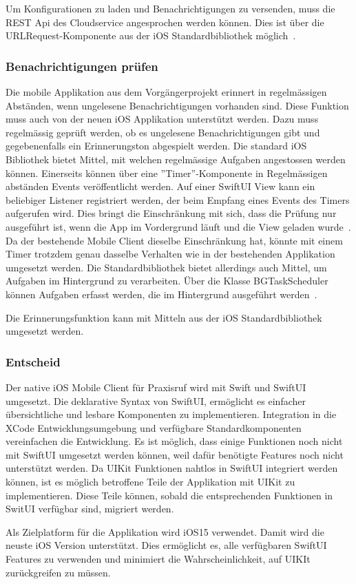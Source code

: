 Um Konfigurationen zu laden und Benachrichtigungen zu versenden, muss die REST Api des Cloudservice angesprochen werden können.
Dies ist über die URLRequest-Komponente aus der iOS Standardbibliothek möglich~\cite{ios_urlrequest}.

\subsubsection{Benachrichtigungen prüfen}

Die mobile Applikation aus dem Vorgängerprojekt erinnert in regelmässigen Abständen, wenn ungelesene Benachrichtigungen vorhanden sind.
Diese Funktion muss auch von der neuen iOS Applikation unterstützt werden.
Dazu muss regelmässig geprüft werden, ob es ungelesene Benachrichtigungen gibt und gegebenenfalls ein Erinnerungston abgespielt werden.
Die standard iOS Bibliothek bietet Mittel, mit welchen regelmässige Aufgaben angestossen werden können.
Einerseits können über eine ''Timer''-Komponente in Regelmässigen abständen Events veröffentlicht werden.
Auf einer SwiftUI View kann ein beliebiger Listener registriert werden, der beim Empfang eines Events des Timers aufgerufen wird.
Dies bringt die Einschränkung mit sich, dass die Prüfung nur ausgeführt ist, wenn die App im Vordergrund läuft und die View geladen wurde~\cite{ios_timer}.
Da der bestehende Mobile Client dieselbe Einschränkung hat, könnte mit einem Timer trotzdem genau dasselbe Verhalten wie in der bestehenden Applikation umgesetzt werden.
Die Standardbibliothek bietet allerdings auch Mittel, um Aufgaben im Hintergrund zu verarbeiten.
Über die Klasse BGTaskScheduler können Aufgaben erfasst werden, die im Hintergrund ausgeführt werden~\cite{ios_bgtaskscheduler}.

Die Erinnerungsfunktion kann mit Mitteln aus der iOS Standardbibliothek umgesetzt werden.

\subsubsection{Entscheid}

Der native iOS Mobile Client für Praxisruf wird mit Swift und SwiftUI umgesetzt.
Die deklarative Syntax von SwiftUI, ermöglicht es einfacher übersichtliche und lesbare Komponenten zu implementieren.
Integration in die XCode Entwicklungsumgebung und verfügbare Standardkomponenten vereinfachen die Entwicklung.
Es ist möglich, dass einige Funktionen noch nicht mit SwiftUI umgesetzt werden können, weil dafür benötigte Features noch nicht unterstützt werden.
Da UIKit Funktionen nahtlos in SwiftUI integriert werden können, ist es möglich betroffene Teile der Applikation mit UIKit zu implementieren.
Diese Teile können, sobald die entsprechenden Funktionen in SwitUI verfügbar sind, migriert werden.

Als Zielplatform für die Applikation wird iOS15 verwendet.
Damit wird die neuste iOS Version unterstützt.
Dies ermöglicht es, alle verfügbaren SwiftUI Features zu verwenden und minimiert die Wahrscheinlichkeit, auf UIKIt zurückgreifen zu müssen.

\clearpage
